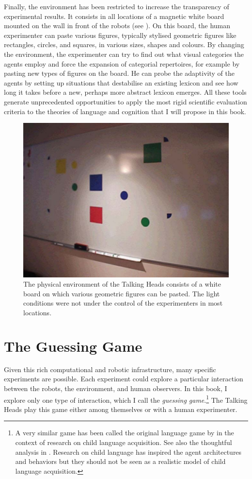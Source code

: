 Finally, the environment has been restricted to 
increase the transparency of experimental results. It 
consists in all locations of a magnetic white board mounted
on the wall in front of the robots (see ). On this
board, the human experimenter can paste various
figures, typically stylised geometric figures like 
rectangles, circles, and squares,
in various sizes, shapes and colours. By changing the 
environment, the experimenter can try to find out what
visual categories the agents employ and force the expansion 
of categorial repertoires, for example by pasting
new types of figures on the board. He can probe the 
adaptivity of the agents by setting up situations that 
destabilise an existing lexicon and see how long it 
takes before a new, perhaps more abstract lexicon emerges. 
All these tools generate unprecedented opportunities to apply 
the most rigid scientific evaluation criteria to the
theories of language and cognition that I will propose in this
book. 
\begin{figure}[htbp]
  \centerline{\includegraphics[width=.60\textwidth]{chap1/figs/Whiteboard}}
\caption{ The physical environment of the Talking Heads  
consists of a white board on which various
geometric figures can be pasted. The light conditions were not under the control 
of the experimenters in most locations.}
\label{f:plate9}
\end{figure}

\section{The Guessing Game}

Given this rich computational and robotic infrastructure, many 
specific experiments are possible. 
Each experiment could explore
a particular interaction between the robots, the environment, 
and human observers. In this book, I explore only 
one type of interaction, which I call the
{\it guessing game}.\footnote{
A very similar game has been called the original 
language game by \cite{Brown:1973} in the context of
research on child language acquisition. See also 
the thoughtful analysis in \cite{Halliday:1975}. 
Research on child language has inspired the 
agent architectures and behaviors but they should not
be seen as a realistic model of child language acquisition.}
The Talking Heads play this game 
either among themselves or with a human experimenter. 

